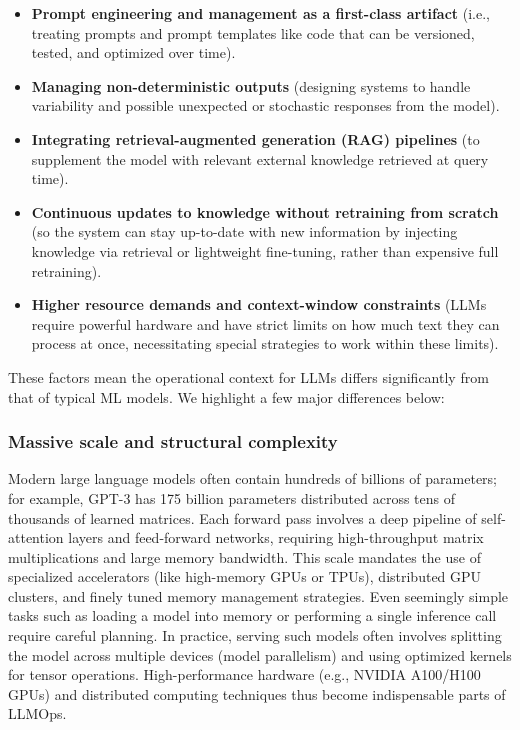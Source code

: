 \begin{itemize}
    \item \textbf{Prompt engineering and management as a first-class artifact} \parencite{Chowdhery2022palm} (i.e., treating prompts and prompt templates like code that can be versioned, tested, and optimized over time).
    \item \textbf{Managing non-deterministic outputs} \parencite{kamathDeepDive} (designing systems to handle variability and possible unexpected or stochastic responses from the model).
    \item \textbf{Integrating retrieval-augmented generation (RAG) pipelines} \parencite{Borzunov2023Petals} (to supplement the model with relevant external knowledge retrieved at query time).
    \item \textbf{Continuous updates to knowledge without retraining from scratch} \parencite{Zheng2024sglang} (so the system can stay up-to-date with new information by injecting knowledge via retrieval or lightweight fine-tuning, rather than expensive full retraining).
    \item \textbf{Higher resource demands and context-window constraints} \parencite{Zhang2024Coupled,Liu2023Scissorhands} (LLMs require powerful hardware and have strict limits on how much text they can process at once, necessitating special strategies to work within these limits).
\end{itemize}

These factors mean the operational context for LLMs differs significantly from that of typical ML models. We highlight a few major differences below:

\subsubsection{Massive scale and structural complexity} Modern large language models often contain hundreds of billions of parameters; for example, GPT-3 has 175 billion parameters distributed across tens of thousands of learned matrices. Each forward pass involves a deep pipeline of self-attention layers and feed-forward networks, requiring high-throughput matrix multiplications and large memory bandwidth. This scale mandates the use of specialized accelerators (like high-memory GPUs or TPUs), distributed GPU clusters, and finely tuned memory management strategies.
Even seemingly simple tasks such as loading a model into memory or performing a single inference call require careful planning. In practice, serving such models often involves splitting the model across multiple devices (model parallelism) and using optimized kernels for tensor operations. High-performance hardware (e.g., NVIDIA A100/H100 GPUs) and distributed computing techniques thus become indispensable parts of LLMOps.

